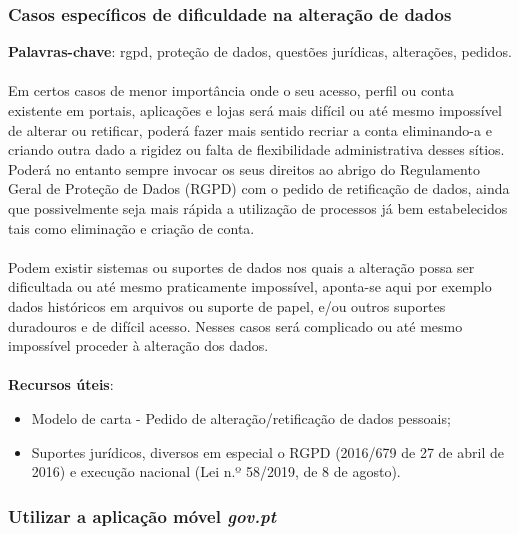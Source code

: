\newpage

\subsubsection{Casos específicos de dificuldade na alteração de dados}

\textbf{Palavras-chave}: rgpd, proteção de dados, questões jurídicas, alterações, pedidos. \\
\\
Em certos casos de menor importância onde o seu acesso, perfil ou conta
existente em portais, aplicações e lojas será mais difícil ou até mesmo
impossível de alterar ou retificar, poderá fazer mais sentido recriar a
conta eliminando-a e criando outra dado a rigidez ou falta de
flexibilidade administrativa desses sítios. Poderá no entanto sempre
invocar os seus direitos ao abrigo do Regulamento Geral de Proteção de
Dados (RGPD) com o pedido de retificação de dados, ainda que
possivelmente seja mais rápida a utilização de processos já bem
estabelecidos tais como eliminação e criação de conta. \\
\\
Podem existir sistemas ou suportes de dados nos quais a alteração possa
ser dificultada ou até mesmo praticamente impossível, aponta-se aqui por
exemplo dados históricos em arquivos ou suporte de papel, e/ou outros
suportes duradouros e de difícil acesso. Nesses casos será complicado ou
até mesmo impossível proceder à alteração dos dados. \\
\\
\textbf{Recursos úteis}:
\begin{itemize}
	\item Modelo de carta - Pedido de alteração/retificação de dados pessoais;
	\item Suportes jurídicos, diversos em especial o RGPD (2016/679 de 27 de abril de 2016) e execução nacional (Lei n.º 58/2019, de 8 de agosto).
\end{itemize}

\subsubsection{\texorpdfstring{Utilizar a aplicação móvel \emph{gov.pt}}{Utilizar a aplicação móvel gov.pt}}

